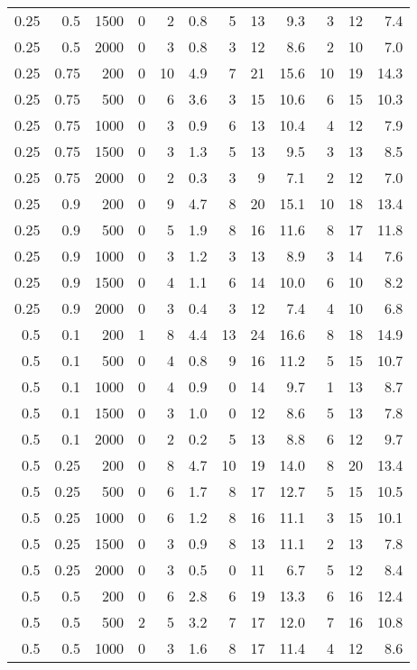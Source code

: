 \documentclass[a4paper, 12pt]{extreport}
\begin{document}
\begin{longtable}{|r|r|r|r|r|r|r|r|r|r|r|r|}
0.25 & 0.5 & 1500 & 0 & 2 & 0.8 & 5 & 13 & 9.3 & 3 & 12 & 7.4 \\ 
0.25 & 0.5 & 2000 & 0 & 3 & 0.8 & 3 & 12 & 8.6 & 2 & 10 & 7.0 \\ 
\hline
0.25 & 0.75 & 200 & 0 & 10 & 4.9 & 7 & 21 & 15.6 & 10 & 19 & 14.3 \\ 
0.25 & 0.75 & 500 & 0 & 6 & 3.6 & 3 & 15 & 10.6 & 6 & 15 & 10.3 \\ 
0.25 & 0.75 & 1000 & 0 & 3 & 0.9 & 6 & 13 & 10.4 & 4 & 12 & 7.9 \\ 
0.25 & 0.75 & 1500 & 0 & 3 & 1.3 & 5 & 13 & 9.5 & 3 & 13 & 8.5 \\ 
0.25 & 0.75 & 2000 & 0 & 2 & 0.3 & 3 & 9 & 7.1 & 2 & 12 & 7.0 \\ 
\hline
0.25 & 0.9 & 200 & 0 & 9 & 4.7 & 8 & 20 & 15.1 & 10 & 18 & 13.4 \\ 
0.25 & 0.9 & 500 & 0 & 5 & 1.9 & 8 & 16 & 11.6 & 8 & 17 & 11.8 \\ 
0.25 & 0.9 & 1000 & 0 & 3 & 1.2 & 3 & 13 & 8.9 & 3 & 14 & 7.6 \\ 
0.25 & 0.9 & 1500 & 0 & 4 & 1.1 & 6 & 14 & 10.0 & 6 & 10 & 8.2 \\ 
0.25 & 0.9 & 2000 & 0 & 3 & 0.4 & 3 & 12 & 7.4 & 4 & 10 & 6.8 \\ 
\hline
0.5 & 0.1 & 200 & 1 & 8 & 4.4 & 13 & 24 & 16.6 & 8 & 18 & 14.9 \\ 
0.5 & 0.1 & 500 & 0 & 4 & 0.8 & 9 & 16 & 11.2 & 5 & 15 & 10.7 \\ 
0.5 & 0.1 & 1000 & 0 & 4 & 0.9 & 0 & 14 & 9.7 & 1 & 13 & 8.7 \\ 
0.5 & 0.1 & 1500 & 0 & 3 & 1.0 & 0 & 12 & 8.6 & 5 & 13 & 7.8 \\ 
0.5 & 0.1 & 2000 & 0 & 2 & 0.2 & 5 & 13 & 8.8 & 6 & 12 & 9.7 \\ 
\hline
0.5 & 0.25 & 200 & 0 & 8 & 4.7 & 10 & 19 & 14.0 & 8 & 20 & 13.4 \\ 
0.5 & 0.25 & 500 & 0 & 6 & 1.7 & 8 & 17 & 12.7 & 5 & 15 & 10.5 \\ 
0.5 & 0.25 & 1000 & 0 & 6 & 1.2 & 8 & 16 & 11.1 & 3 & 15 & 10.1 \\ 
0.5 & 0.25 & 1500 & 0 & 3 & 0.9 & 8 & 13 & 11.1 & 2 & 13 & 7.8 \\ 
0.5 & 0.25 & 2000 & 0 & 3 & 0.5 & 0 & 11 & 6.7 & 5 & 12 & 8.4 \\ 
\hline
0.5 & 0.5 & 200 & 0 & 6 & 2.8 & 6 & 19 & 13.3 & 6 & 16 & 12.4 \\ 
0.5 & 0.5 & 500 & 2 & 5 & 3.2 & 7 & 17 & 12.0 & 7 & 16 & 10.8 \\ 
0.5 & 0.5 & 1000 & 0 & 3 & 1.6 & 8 & 17 & 11.4 & 4 & 12 & 8.6 \\ 

\end{longtable}
\end{document}
